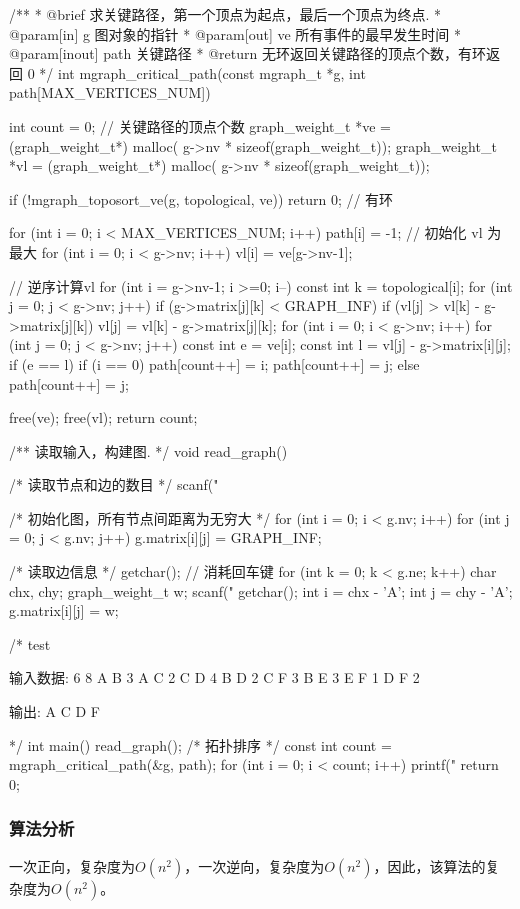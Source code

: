 \begin{Codex}[label=mgraph_critical_path.c]
/**
  * @brief 求关键路径，第一个顶点为起点，最后一个顶点为终点.
  * @param[in] g 图对象的指针
  * @param[out] ve 所有事件的最早发生时间
  * @param[inout] path 关键路径
  * @return 无环返回关键路径的顶点个数，有环返回 0
  */
int mgraph_critical_path(const mgraph_t *g, int path[MAX_VERTICES_NUM]) {
    int count = 0;    // 关键路径的顶点个数
    graph_weight_t *ve = (graph_weight_t*) malloc(
            g->nv * sizeof(graph_weight_t));
    graph_weight_t *vl = (graph_weight_t*) malloc(
            g->nv * sizeof(graph_weight_t));

    if (!mgraph_toposort_ve(g, topological, ve)) return 0;  // 有环

    for (int i = 0; i < MAX_VERTICES_NUM; i++) path[i] = -1;
    // 初始化 vl 为最大
    for (int i = 0; i < g->nv; i++) vl[i] = ve[g->nv-1];

    // 逆序计算vl
    for (int i = g->nv-1; i >=0; i--) {
        const int k = topological[i];
        for (int j = 0; j < g->nv; j++) {
            if (g->matrix[j][k] < GRAPH_INF) {
                if (vl[j] > vl[k] - g->matrix[j][k])
                    vl[j] = vl[k] - g->matrix[j][k];
            }
        }
    }
    for (int i = 0; i < g->nv; i++) {
        for (int j = 0; j < g->nv; j++) {
            const int e = ve[i];
            const int l = vl[j] - g->matrix[i][j];
            if (e == l) {
                if (i == 0) {
                    path[count++] = i;
                    path[count++] = j;
                } else {
                    path[count++] = j;
                }
            }
        }
    }

    free(ve);
    free(vl);
    return count;
}

/** 读取输入，构建图. */
void read_graph() {
    /* 读取节点和边的数目 */
    scanf("%

    /* 初始化图，所有节点间距离为无穷大 */
    for (int i = 0; i < g.nv; i++) {
        for (int j = 0; j < g.nv; j++) {
            g.matrix[i][j] = GRAPH_INF;
        }
    }

    /* 读取边信息 */
    getchar(); // 消耗回车键
    for (int k = 0; k < g.ne; k++) {
        char chx, chy;
        graph_weight_t w;
        scanf("%
        getchar();
        int i = chx - 'A';
        int j = chy - 'A';
        g.matrix[i][j] = w;
    }
}

/* test

输入数据:
6 8
A B 3
A C 2
C D 4
B D 2
C F 3
B E 3
E F 1
D F 2

输出: A C D F

*/
int main() {
    read_graph();
    /* 拓扑排序 */
    const int count = mgraph_critical_path(&g, path);
    for (int i = 0; i < count; i++) {
        printf("%
    }
    return 0;
}
\end{Codex}

\subsubsection{算法分析}
一次正向，复杂度为$O(n^2)$，一次逆向，复杂度为$O(n^2)$，因此，该算法的复杂度为$O(n^2)$。
